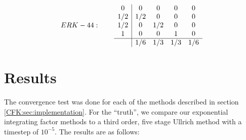 \documentclass{csri19}
\begin{document}
\[ ERK - 44: \qquad
\begin{array}{c|cccc}
0   & 0   & 0   & 0   & 0 \\
1/2 & 1/2 & 0   & 0   & 0 \\
1/2 & 0   & 1/2 & 0   & 0 \\
1   & 0   & 0   & 1   & 0 \\
\hline
    & 1/6 & 1/3 & 1/3 & 1/6
\end{array} 
\]

\section{Results}\label{CFK:sec:results}
The convergence test was done for each of the methods described in section
 \ref{CFK:sec:implementation}. For the ``truth'', we compare our 
exponential integrating factor methods to a third order, five stage 
Ullrich method with a timestep of $10^{-5}$. The results are as follows:
\end{document}
